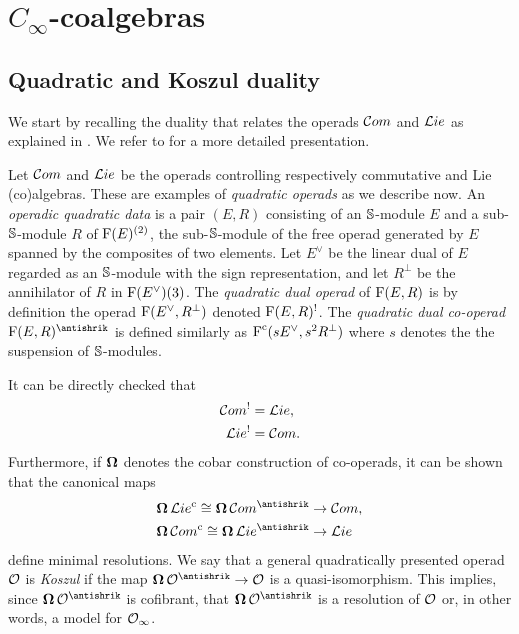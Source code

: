 
\section{\texorpdfstring{$C_\infty$}{C-infty}-coalgebras} \label{s:rationally}

\subsection{Quadratic and Koszul duality}

We start by recalling the duality that relates the operads $\mathcal{C}om$ and $\mathcal{L}ie$ as explained in \cite{ginzburg1994koszul}.
We refer to \cite[Ch.~7,~10]{loday2012operads} for a more detailed presentation.

Let $\mathcal{C}om$ and $\mathcal{L}ie$ be the operads controlling respectively commutative and Lie (co)algebras.
These are examples of \textit{quadratic operads} as we describe now.
An \textit{operadic quadratic data} is a pair $(E, R)$ consisting of an $\mathbb{S}$-module $E$ and a sub-$\mathbb{S}$-module $R$ of $\operatorname{F}(E)^{(2)}$, the sub-$\mathbb{S}$-module of the free operad generated by $E$ spanned by the composites of two elements.
Let $E^\vee$ be the linear dual of $E$ regarded as an $\mathbb{S}$-module with the sign representation, and let $R^\perp$ be the annihilator of $R$ in $\operatorname{F}(E^\vee)(3)$.
The \textit{quadratic dual operad} of $\operatorname{F}(E, R)$ is by definition the operad $\operatorname{F}(E^\vee, R^\perp)$ denoted $\operatorname{F}(E, R)^!$.
The \textit{quadratic dual co-operad} $\free(E, R)^\antishrik$ is defined similarly as $\operatorname{F}^{\mathrm{c}}(s E^\vee, s^2 R^\perp)$ where $s$ denotes the the suspension of $\mathbb{S}$-modules.

It can be directly checked that
\begin{align*}
\mathcal{C}om^! &= \mathcal{L}ie, \\
\mathcal{L}ie^! &= \mathcal{C}om.
\end{align*}
Furthermore, if $\operatorname{\mathbf{\Omega}}$ denotes the cobar construction of co-operads, it can be shown that the canonical maps
\begin{align*}
\cobar \lie^\c \cong \cobar \com^\antishrik &\to \com, \\
\cobar \com^\c \cong \cobar \lie^\antishrik &\to \lie
\end{align*}
define minimal resolutions.
We say that a general quadratically presented operad $\mathcal{O}$ is \textit{Koszul} if the map $\cobar \cO^\antishrik \to \cO$ is a quasi-isomorphism.
This implies, since $\cobar \cO^\antishrik$ is cofibrant, that $\cobar \cO^\antishrik$ is a resolution of $\mathcal{O}$ or, in other words, a model for $\mathcal{O}_\infty$.

